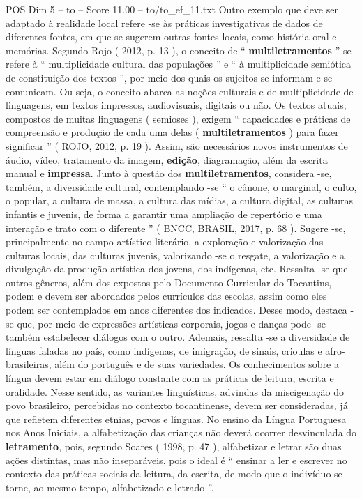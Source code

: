 \begin{textsample}{POS Dim 5 – to – Score 11.00 – to/to\_ef\_11.txt}
Outro exemplo que deve ser adaptado à realidade local refere -se às práticas investigativas de dados de diferentes fontes, em que se sugerem outras fontes locais, como história oral e memórias.
Segundo Rojo ( 2012, p. 13 ), o conceito de “ \textbf{multiletramentos} ” se refere à “ multiplicidade cultural das populações ” e “ à multiplicidade semiótica de constituição dos textos ”, por meio dos quais os sujeitos se informam e se comunicam.
Ou seja, o conceito abarca as noções culturais e de multiplicidade de linguagens, em textos impressos, audiovisuais, digitais ou não.
Os textos atuais, compostos de muitas linguagens ( semioses ), exigem “ capacidades e práticas de compreensão e produção de cada uma delas ( \textbf{multiletramentos} ) para fazer significar ” ( ROJO, 2012, p. 19 ).
Assim, são necessários novos instrumentos de áudio, vídeo, tratamento da imagem, \textbf{edição}, diagramação, além da escrita manual e \textbf{impressa}.
Junto à questão dos \textbf{multiletramentos}, considera -se, também, a diversidade cultural, contemplando -se “ o cânone, o marginal, o culto, o popular, a cultura de massa, a cultura das mídias, a cultura digital, as culturas infantis e juvenis, de forma a garantir uma ampliação de repertório e uma interação e trato com o diferente ” ( BNCC, BRASIL, 2017, p. 68 ).
Sugere -se, principalmente no campo artístico-literário, a exploração e valorização das culturas locais, das culturas juvenis, valorizando -se o resgate, a valorização e a divulgação da produção artística dos jovens, dos indígenas, etc.
Ressalta -se que outros gêneros, além dos expostos pelo Documento Curricular do Tocantins, podem e devem ser abordados pelos currículos das escolas, assim como eles podem ser contemplados em anos diferentes dos indicados.
Desse modo, destaca -se que, por meio de expressões artísticas corporais, jogos e danças pode -se também estabelecer diálogos com o outro.
Ademais, ressalta -se a diversidade de línguas faladas no país, como indígenas, de imigração, de sinais, crioulas e afro-brasileiras, além do português e de suas variedades.
Os conhecimentos sobre a língua devem estar em diálogo constante com as práticas de leitura, escrita e oralidade.
Nesse sentido, as variantes linguísticas, advindas da miscigenação do povo brasileiro, percebidas no contexto tocantinense, devem ser consideradas, já que refletem diferentes etnias, povos e línguas.
No ensino da Língua Portuguesa nos Anos Iniciais, a alfabetização das crianças não deverá ocorrer desvinculada do \textbf{letramento}, pois, segundo Soares ( 1998, p. 47 ), alfabetizar e letrar são duas ações distintas, mas não inseparáveis, pois o ideal é “ ensinar a ler e escrever no contexto das práticas sociais da leitura, da escrita, de modo que o indivíduo se torne, ao mesmo tempo, alfabetizado e letrado ”.

\end{textsample}
